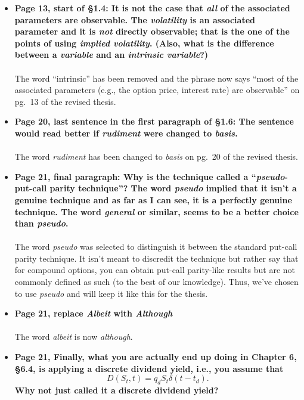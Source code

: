 \documentclass{article}
\begin{document}
\begin{enumerate}
\begin{itemize}
			\item{\textbf{Page 13, start of \S1.4: It is not the case that \emph{all} of the associated parameters are observable. The \emph{volatility} is an associated parameter and it is \emph{not} directly observable; that is the one of the points of using \emph{implied volatility}. (Also, what is the difference between a \emph{variable} and an \emph{intrinsic variable}?)
			\\\\}}
			The word ``intrinsic'' has been removed and the phrase now says ``most of the associated parameters (e.g., the option price, interest rate) are observable'' on pg.~13 of the revised thesis.
			
			\item{\textbf{Page 20, last sentence in the first paragraph of \S1.6: The sentence would read better if \emph{rudiment} were changed to \emph{basis}.
			\\\\}}
			The word \emph{rudiment} has been changed to \emph{basis} on pg.~20 of the revised thesis.
			
			\item{\textbf{Page 21, final paragraph: Why is the technique called a ``\emph{pseudo}-put-call parity technique''? The word \emph{pseudo} implied that it isn't a genuine technique and as far as I can see, it is a perfectly genuine technique. The word \emph{general} or similar, seems to be a better choice than \emph{pseudo}.\\\\}}
			The word \emph{pseudo} was selected to distinguish it between the standard put-call parity technique. It isn't meant to discredit the technique but rather say that for compound options, you can obtain put-call parity-like results but are not commonly defined as such (to the best of our knowledge). Thus, we've chosen to use \emph{pseudo} and will keep it like this for the thesis. 
			
			\item{\textbf{Page 21, replace \emph{Albeit} with \emph{Although}\\\\}}
			The word \emph{albeit} is now \emph{although}.
			
			\item{\textbf{Page 21, Finally, what you are actually end up doing in Chapter 6, \S6.4, is applying a discrete dividend yield, i.e., you assume that
			$$
				D(S_t,t) = q_dS_t\delta(t-t_d).
			$$
			Why not just called it a discrete dividend yield? \\\\}}
			

\end{itemize}
\end{enumerate}
\end{document}
